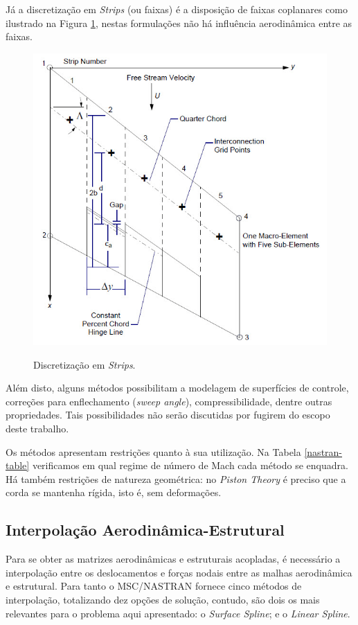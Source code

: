 Já a discretização em \emph{Strips} (ou faixas)  é a disposição de faixas coplanares como ilustrado na Figura \ref{fig-strips}, nestas formulações não há influência aerodinâmica entre as faixas.

\begin{figure}[H]
\centering
\caption{Discretização em \emph{Strips}.}
\includegraphics[width=0.5\linewidth]{figures/strip.png}
\label{fig-strips}
\end{figure}

Além disto, alguns métodos possibilitam a modelagem de superfícies de controle, correções para enflechamento (\emph{sweep angle}), compressibilidade, dentre outras propriedades. Tais possibilidades não serão discutidas por fugirem do escopo deste trabalho.

Os métodos apresentam restrições quanto à sua utilização. Na Tabela \ref{nastran-table} verificamos em qual regime de número de Mach cada método se enquadra. Há também restrições de natureza geométrica: no \emph{Piston Theory} é preciso que a corda se mantenha rígida, isto é, sem deformações.

\subsection{Interpolação Aerodinâmica-Estrutural}

Para se obter as matrizes aerodinâmicas e estruturais acopladas, é necessário a interpolação entre os deslocamentos e forças nodais entre as malhas aerodinâmica e estrutural. Para tanto o MSC/NASTRAN fornece cinco métodos de interpolação, totalizando dez opções de solução, contudo, são dois os mais relevantes para o problema aqui apresentado: o \emph{Surface Spline}; e o \emph{Linear Spline}.

